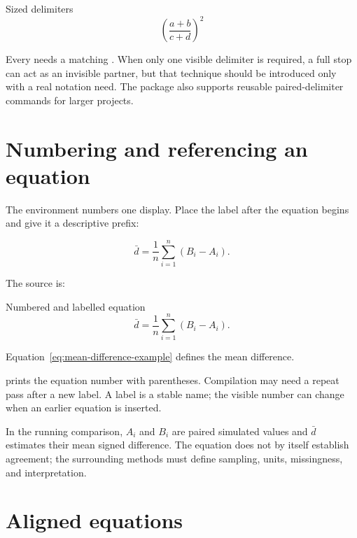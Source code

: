\begin{latexcode}{Sized delimiters}
\[
  \left(\frac{a+b}{c+d}\right)^2
\]
\end{latexcode}

Every  needs a matching . When only one visible delimiter
is required, a full stop can act as an invisible partner, but that technique
should be introduced only with a real notation need. The 
package also supports reusable paired-delimiter commands for larger projects.

\section{Numbering and referencing an equation}

The  environment numbers one display. Place the label after the
equation begins and give it a descriptive prefix:

\begin{equation}
  \bar{d}=\frac{1}{n}\sum_{i=1}^{n}(B_i-A_i).
  \label{eq:mean-difference}
\end{equation}

The source is:

\begin{latexcode}{Numbered and labelled equation}
\begin{equation}
  \bar{d}=\frac{1}{n}\sum_{i=1}^{n}(B_i-A_i).
  \label{eq:mean-difference-example}
\end{equation}

Equation~\eqref{eq:mean-difference-example} defines the mean difference.
\end{latexcode}

 prints the equation number with parentheses. Compilation may need
a repeat pass after a new label. A label is a stable name; the visible number
can change when an earlier equation is inserted.

\begin{scienceinpractice}
In the running comparison, $A_i$ and $B_i$ are paired simulated values and
$\bar{d}$ estimates their mean signed difference. The equation does not by
itself establish agreement; the surrounding methods must define sampling,
units, missingness, and interpretation.
\end{scienceinpractice}

\section{Aligned equations}

